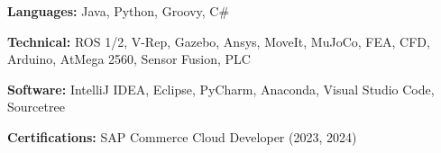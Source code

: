 
\begin{cvskills}

  \cvskill
    { \bf Languages:} %
    { Java, Python, Groovy, C\#}

  \cvskill
    {\bf Technical:} %
    { ROS 1/2, V-Rep, Gazebo, Ansys, MoveIt, MuJoCo, FEA, CFD, Arduino, AtMega 2560, Sensor Fusion, PLC}

  \cvskill
    {\bf Software:} %
    { IntelliJ IDEA, Eclipse, PyCharm, Anaconda, Visual Studio Code, Sourcetree}

  \cvskill
    {\bf Certifications:} %
    { SAP Commerce Cloud Developer (2023, 2024)}


\end{cvskills}
